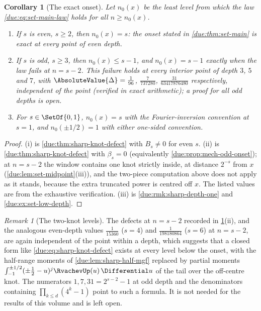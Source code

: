 \documentclass[11pt,oneside]{article}
\theoremstyle{plain}
\newtheorem{corollary}[theorem]{Corollary}
\theoremstyle{definition}
\theoremstyle{remark}
\newtheorem{remark}[theorem]{Remark}
\begin{document}
\begin{corollary}[The exact onset]
\label{due:cor:sharp-onset}
Let $n_{0}(x)$ be the least level from which the law
\cref{due:eq:set-main-law} holds for all $n\ge n_{0}(x)$.
\begin{enumerate}[label=\textup{(\roman*)}]
\item If $s$ is even, $s\ge2$, then $n_{0}(x)=s$: the onset stated in
 \cref{due:thm:set-main} is exact at every point of even depth.
\item If $s$ is odd, $s\ge3$, then $n_{0}(x)\le s-1$, and $n_{0}(x)=s-1$
 exactly when the law fails at $n=s-2$.  This failure holds at every
 interior point of depth $3$, $5$ and $7$, with
 $\AbsoluteValue{\Delta}=\tfrac1{96}$, $\tfrac{7}{737280}$,
 $\tfrac{31}{63417876480}$ respectively, independent of the point
 (verified in exact arithmetic); a proof for all odd depths is open.
\item For $s\in\SetOf{0,1}$, $n_{0}(x)=s$ with the Fourier-inversion
 convention at $s=1$, and $n_{0}(\pm1/2)=1$ with either one-sided
 convention.
\end{enumerate}
\end{corollary}

\begin{proof}
(i) is \cref{due:thm:sharp-knot-defect} with $B_{s}\ne0$ for even $s$.
(ii) is \cref{due:thm:sharp-knot-defect} with $\beta_{s}=0$
(equivalently \cref{due:prop:mech-odd-onset}); at $n=s-2$ the window
contains one knot strictly inside, at distance $2^{-s}$ from $x$
(\cref{due:lem:set-midpoint}(iii)), and the two-piece computation above
does not apply as it stands, because the extra truncated power is centred
off $x$.  The listed values are from the exhaustive verification.  (iii)
is \cref{due:rmk:sharp-depth-one} and \cref{due:ex:set-low-depth}.
\end{proof}

\begin{remark}[The two-knot levels]
\label{due:rmk:sharp-two-knots}
The defects at $n=s-2$ recorded in \cref{due:cor:sharp-onset}(ii), and the
analogous even-depth values $\tfrac1{15360}$ ($s=4$) and
$\tfrac{1}{198180864}$ ($s=6$) at $n=s-2$, are again independent of the
point within a depth, which suggests that a closed form like
\cref{due:eq:sharp-knot-defect} exists at every level below the onset, with
the half-range moments of \cref{due:lem:sharp-half-mgf} replaced by partial
moments $\int_{-1}^{\pm1/2}(\pm\tfrac12-u)^{j}\RvachevUp(u)\,\Differential u$ of
the tail over the off-centre knot.  The numerators $1,7,31=2^{s-2}-1$ at
odd depth and the denominators containing $\prod_{k\le d}(4^{k}-1)$ point
to such a formula.  It is not needed for the results of this volume and is
left open.
\end{remark}
\end{document}
